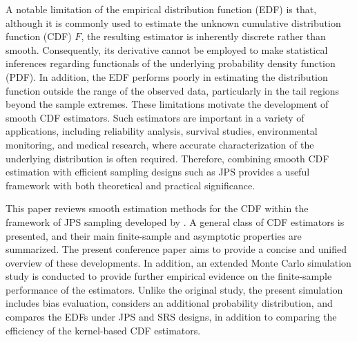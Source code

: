 \documentclass[twoside]{article}
\begin{document}
{\color{blue} 
A notable limitation of the empirical distribution function (EDF) is that, although it is commonly used to estimate the unknown cumulative distribution function (CDF) $F$, the resulting estimator is inherently discrete rather than smooth. Consequently, its derivative cannot be employed to make statistical inferences regarding functionals of the underlying probability density function (PDF). In addition, the EDF performs poorly in estimating the distribution function outside the range of the observed data, particularly in the tail regions beyond the sample extremes. These limitations motivate the development of smooth CDF estimators. Such estimators are important in a variety of applications, including reliability analysis, survival studies, environmental monitoring, and medical research, where accurate characterization of the underlying distribution is often required. Therefore, combining smooth CDF estimation with efficient sampling designs such as JPS provides a useful framework with both theoretical and practical significance.

This paper reviews smooth estimation methods for the CDF within the framework of JPS sampling developed  by \cite{kouhanestani2025statistical}. A general class of CDF estimators is presented, and their main finite-sample and asymptotic properties are summarized. The present conference paper aims to provide a concise and unified overview of these developments. In addition, an extended Monte Carlo simulation study is conducted to provide further empirical evidence on the finite-sample performance of the estimators. Unlike the original study, the present simulation includes bias evaluation, considers an additional probability distribution, and compares the EDFs under JPS and SRS designs, in addition to comparing the efficiency of the kernel-based CDF estimators.
}


\end{document}
